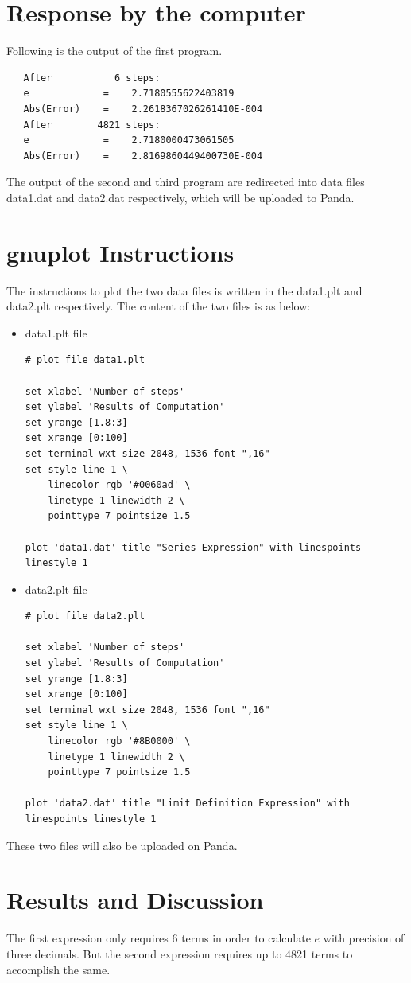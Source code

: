 \documentclass[11pt]{article}
\begin{document}
\section{Response by the computer}
Following is the output of the first program. 
\begin{verbatim}
   After           6 steps:
   e             =    2.7180555622403819     
   Abs(Error)    =    2.2618367026261410E-004
   After        4821 steps:
   e             =    2.7180000473061505     
   Abs(Error)    =    2.8169860449400730E-004   
\end{verbatim}

The output of the second and third program are redirected into data files data1.dat and data2.dat respectively, which will be uploaded to Panda. 
\newpage
\section{gnuplot Instructions}
The instructions to plot the two data files is written in the data1.plt and data2.plt respectively. The content of the two files is as below:
\begin{itemize}
   \item data1.plt file
\begin{verbatim}
# plot file data1.plt

set xlabel 'Number of steps'
set ylabel 'Results of Computation'
set yrange [1.8:3]
set xrange [0:100]
set terminal wxt size 2048, 1536 font ",16"
set style line 1 \
    linecolor rgb '#0060ad' \
    linetype 1 linewidth 2 \
    pointtype 7 pointsize 1.5

plot 'data1.dat' title "Series Expression" with linespoints linestyle 1
\end{verbatim}
\item data2.plt file
\begin{verbatim}
# plot file data2.plt

set xlabel 'Number of steps'
set ylabel 'Results of Computation'
set yrange [1.8:3]
set xrange [0:100]
set terminal wxt size 2048, 1536 font ",16"
set style line 1 \
    linecolor rgb '#8B0000' \
    linetype 1 linewidth 2 \
    pointtype 7 pointsize 1.5

plot 'data2.dat' title "Limit Definition Expression" with linespoints linestyle 1
\end{verbatim}
\end{itemize}
These two files will also be uploaded on Panda. 
\newpage
\section{Results and Discussion}
The first expression only requires 6 terms in order to calculate $e$ with precision of three decimals. But the second expression requires up to 4821 terms to accomplish the same. 
\end{document}
